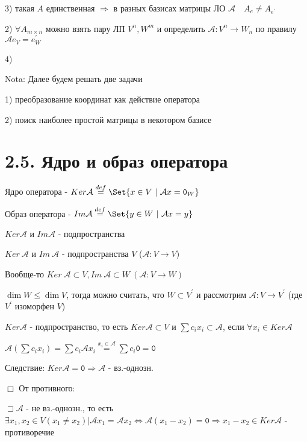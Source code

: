 \documentclass[12pt]{article}
\begin{document}
    3) такая $A$ единственная $\Longrightarrow$ в разных базисах матрицы ЛО $\mathcal{A} \quad A_e \neq A_{e^\prime}$

    2) $\forall A_{m\times n}$ можно взять пару ЛП $V^n, W^m$ и определить $\mathcal{A} : V^n \rightarrow W_n$ по правилу $\mathcal{A}e_V = e_W^\prime$

    4) \Lab

    Nota: Далее будем решать две задачи

    1) преобразование координат как действие оператора

    2) поиск наиболее простой матрицы в некотором базисе

    \section{2.5. Ядро и образ оператора}

    \hypertarget{kernalandimageofoperator}{}

    \Def Ядро оператора - $Ker \mathcal{A} \stackrel{def}{=} \Set{x \in V \ | \ \mathcal{A}x = \texttt{0}_W}$

    \Def Образ оператора - $Im \mathcal{A} \stackrel{def}{=} \Set{y \in W \ | \ \mathcal{A}x = y}$

    \Nota $Ker \mathcal{A}$ и $Im \mathcal{A}$ - подпространства


    \Nota $Ker\ \mathcal{A}$ и $Im\ \mathcal{A}$ - подпространства $V$ ($\mathcal{A} : V \rightarrow V$)

    Вообще-то $Ker\ \mathcal{A} \subset V, Im\ \mathcal{A} \subset W \ (\mathcal{A} : V \rightarrow W)$

    $\dim W \leq \dim V$, тогда можно считать, что $W \subset V^\prime$ и
    рассмотрим $\mathcal{A} : V \rightarrow V^\prime$ (где $V^\prime$ изоморфен $V$)

    $Ker \mathcal{A}$ - подпространство, то есть $Ker \mathcal{A} \subset V$ и
    $\sum c_i x_i \subset \mathcal{A}$, если $\forall x_i \in Ker \mathcal{A}$

    $\mathcal{A} (\sum c_i x_i) = \sum c_i \mathcal{A} x_i \stackrel{x_i \in \mathcal{A}}{=} \sum c_i \texttt{0} = \texttt{0}$

    Следствие: $Ker \mathcal{A} = \texttt{0} \Longrightarrow \mathcal{A}$ - вз.-однозн.

    $\Box$ От противного:

    $\sqsupset \mathcal{A}$ - не вз.-однозн., то есть $\exists x_1, x_2 \in V (x_1 \neq x_2) | \mathcal{A}x_1 = \mathcal{A}x_2 \Longleftrightarrow \mathcal{A} (x_1 - x_2) = \texttt{0} \Longrightarrow x_1 - x_2 \in Ker \mathcal{A}$ - противоречие
\end{document}
